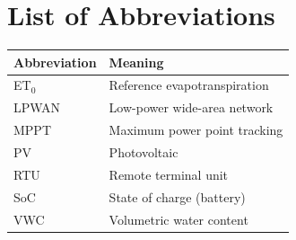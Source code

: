 \chapter*{List of Abbreviations}
\begin{tabularx}{\textwidth}{@{}lX@{}}
\toprule
\rowcolor{cairoblue!10}
\textbf{Abbreviation} & \textbf{Meaning} \\
\midrule
ET$_0$ & Reference evapotranspiration \\
LPWAN & Low-power wide-area network \\
MPPT  & Maximum power point tracking \\
PV    & Photovoltaic \\
RTU   & Remote terminal unit \\
SoC   & State of charge (battery) \\
VWC   & Volumetric water content \\
\bottomrule
\end{tabularx}

